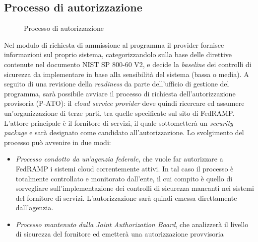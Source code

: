 \documentclass[../main.tex]{subfiles}
\begin{document}
\subsection {Processo di autorizzazione}
\begin{figure}[H]
\centering
{}
\caption{Processo di autorizzazione \cite{understandingFedRAMP} }\label{fig:fedrampactors}
\end{figure}


Nel modulo di richiesta di ammissione al programma il provider fornisce informazioni sul proprio sistema, categorizzandolo sulla base delle direttive contenute nel documento NIST SP 800-60 V2\cite{nist80060}, e decide la \textit{baseline} dei controlli di sicurezza da implementare in base alla sensibilità del sistema (bassa o media).
A seguito di una revisione della \textit{readiness} da parte dell'ufficio di gestione del programma, sarà possibile avviare il processo di richiesta dell'autorizzazione provisoria (P-ATO): il \textit{cloud service provider} deve quindi ricercare ed assumere un'organizzazione di terze parti, tra quelle specificate sul sito di FedRAMP.
L'attore principale è il fornitore di servizi, il quale sottometterà un \textit{security package} e sarà designato come candidato all'autorizzazione. Lo svolgimento del processo può avvenire in due modi:
\begin{itemize}
    \item \textit{Processo condotto da un'agenzia federale}, che vuole far autorizzare a FedRAMP i sistemi cloud correntemente attivi. In tal caso il processo è totalmente controllato e monitorato dall'ente, il cui compito è quello di sorvegliare sull'implementazione dei controlli di sicurezza mancanti nei sistemi del fornitore di servizi. L'autorizzazione sarà quindi emessa direttamente dall'agenzia.
    \item \textit{Processo mantenuto dalla Joint Authorization Board}, che analizzerà il livello di sicurezza del fornitore ed emetterà una autorizzazione provvisoria
\end{itemize}
\end{document}
